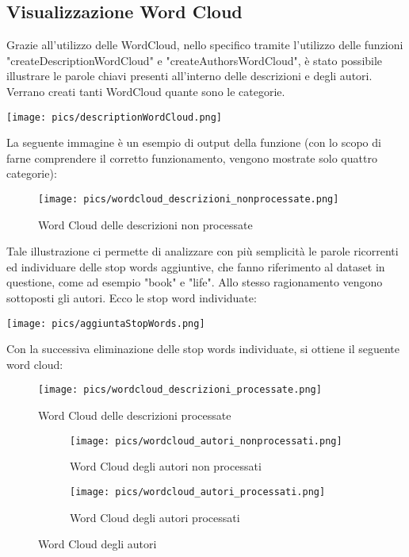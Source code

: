 \documentclass[12pt,oneside]{article}
\begin{document}
    \hfill
    \hfill
    \begin{enumerate}
    \subsection{Visualizzazione Word Cloud}
    \begin{justify}
    Grazie all'utilizzo delle WordCloud, nello specifico tramite l'utilizzo delle funzioni "createDescriptionWordCloud" e "createAuthorsWordCloud", è stato possibile illustrare le parole chiavi presenti all'interno delle descrizioni e degli autori. Verrano creati tanti WordCloud quante sono le categorie.
    \end{justify}
    \texttt{[image: pics/descriptionWordCloud.png]}
    
    \newpage
    \begin{justify}
    La seguente immagine è un esempio di output della funzione (con lo scopo di farne comprendere il corretto funzionamento, vengono mostrate solo quattro categorie):
    \end{justify}
    \begin{figure}[H]
    \centering
    \texttt{[image: pics/wordcloud\_descrizioni\_nonprocessate.png]}
    \caption{Word Cloud delle descrizioni non processate}
    \end{figure}

    \hfill
    \begin{justify}
    Tale illustrazione ci permette di analizzare con più semplicità le parole ricorrenti ed individuare delle stop words aggiuntive, che fanno riferimento al dataset in questione, come ad esempio "book" e "life". Allo stesso ragionamento vengono sottoposti gli autori. Ecco le stop word individuate:
    \end{justify}
    \texttt{[image: pics/aggiuntaStopWords.png]}

    \newpage
    \begin{justify}
    Con la successiva eliminazione delle stop words individuate, si ottiene il seguente word cloud:
    \end{justify}
    \begin{figure}[H]
    \centering
    \texttt{[image: pics/wordcloud\_descrizioni\_processate.png]}
    \caption{Word Cloud delle descrizioni processate}
    \end{figure}

    \hfill
    \hfill
    \begin{figure}[H]
    \begin{subfigure}{0.48\textwidth}
    \texttt{[image: pics/wordcloud\_autori\_nonprocessati.png]} 
    \caption{Word Cloud degli autori non processati}
    \label{fig:subim1}
    \end{subfigure}
    \begin{subfigure}{0.48\textwidth}
    \texttt{[image: pics/wordcloud\_autori\_processati.png]}
    \caption{Word Cloud degli autori processati}
    \label{fig:subim2}
    \end{subfigure}
    \caption{Word Cloud degli autori}
    \end{figure}
    \end{enumerate}
\end{document}
